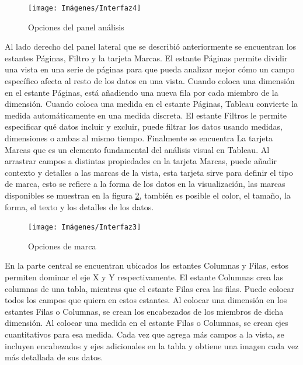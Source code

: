 \documentclass[
]{book}
\begin{document}
\begin{figure}

{\centering \texttt{[image: Imágenes/Interfaz4]} 

}

\caption{Opciones del panel análisis}\label{fig:analisis-fig}
\end{figure}

Al lado derecho del panel lateral que se describió anteriormente se encuentran los estantes Páginas, Filtro y la tarjeta Marcas. El estante Páginas permite dividir una vista en una serie de páginas para que pueda analizar mejor cómo un campo específico afecta al resto de los datos en una vista. Cuando coloca una dimensión en el estante Páginas, está añadiendo una nueva fila por cada miembro de la dimensión. Cuando coloca una medida en el estante Páginas, Tableau convierte la medida automáticamente en una medida discreta. El estante Filtros le permite especificar qué datos incluir y excluir, puede filtrar los datos usando medidas, dimensiones o ambas al mismo tiempo. Finalmente se encuentra La tarjeta Marcas que es un elemento fundamental del análisis visual en Tableau. Al arrastrar campos a distintas propiedades en la tarjeta Marcas, puede añadir contexto y detalles a las marcas de la vista, esta tarjeta sirve para definir el tipo de marca, esto se refiere a la forma de los datos en la visualización, las marcas disponibles se muestran en la figura \ref{fig:marcas-fig}, también es posible el color, el tamaño, la forma, el texto y los detalles de los datos.

\begin{figure}

{\centering \texttt{[image: Imágenes/Interfaz3]} 

}

\caption{Opciones de marca}\label{fig:marcas-fig}
\end{figure}

En la parte central se encuentran ubicados los estantes Columnas y Filas, estos permiten dominar el eje X y Y respectivamente. El estante Columnas crea las columnas de una tabla, mientras que el estante Filas crea las filas. Puede colocar todos los campos que quiera en estos estantes.
Al colocar una dimensión en los estantes Filas o Columnas, se crean los encabezados de los miembros de dicha dimensión. Al colocar una medida en el estante Filas o Columnas, se crean ejes cuantitativos para esa medida. Cada vez que agrega más campos a la vista, se incluyen encabezados y ejes adicionales en la tabla y obtiene una imagen cada vez más detallada de sus datos.
\end{document}
